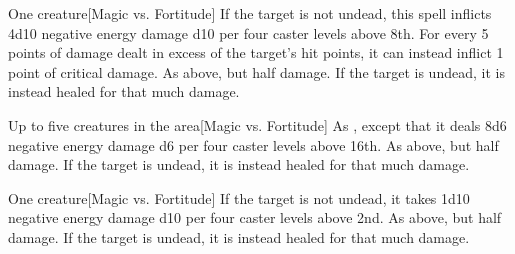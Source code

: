 \begin{spellheader}
    \spellrng{\rngclose}
\end{spellheader}
\begin{spelleffects}
    \begin{spelltarget}{One creature}[Magic vs. Fortitude]
        \spellsuccess If the target is not undead, this spell inflicts 4d10 negative energy damage \add d10 per four caster levels above 8th. For every 5 points of damage dealt in excess of the target's hit points, it can instead inflict 1 point of critical damage.
        \spellfailure As above, but half damage.
        \spelleffect If the target is undead, it is instead healed for that much damage.
    \end{spelltarget}
\end{spelleffects}

\begin{spellheader}
\end{spellheader}
\begin{spelleffects}
    \begin{spelltargets}{Up to five creatures in the area}[Magic vs. Fortitude]
        \spellsuccess As , except that it deals 8d6 negative energy damage \add d6 per four caster levels above 16th.
        \spellfailure As above, but half damage.
        \spelleffect If the target is undead, it is instead healed for that much damage.
    \end{spelltargets}
\end{spelleffects}

\begin{spellheader}
    \spellrng{\rngclose}
\end{spellheader}
\begin{spelleffects}
    \begin{spelltarget}{One creature}[Magic vs. Fortitude]
        \spellsuccess If the target is not undead, it takes 1d10 negative energy damage \add d10 per four caster levels above 2nd.
        \spellfailure As above, but half damage.
        \spelleffect If the target is undead, it is instead healed for that much damage.
    \end{spelltarget}
\end{spelleffects}

